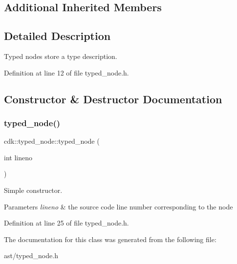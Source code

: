 \subsection*{Additional Inherited Members}


\subsection{Detailed Description}
Typed nodes store a type description. 

Definition at line 12 of file typed\+\_\+node.\+h.



\subsection{Constructor \& Destructor Documentation}
\mbox{\label{classcdk_1_1typed__node_a8dc140896ce9464793806837d6bcd626}} 
\subsubsection{typed\+\_\+node()}
{\footnotesize\ttfamily cdk\+::typed\+\_\+node\+::typed\+\_\+node (\begin{DoxyParamCaption}\item[{int}]{lineno }\end{DoxyParamCaption})\hspace{0.3cm}{\ttfamily [inline]}}

Simple constructor.


\begin{DoxyParams}{Parameters}
{\em lineno} & the source code line number corresponding to the node \\
\hline
\end{DoxyParams}


Definition at line 25 of file typed\+\_\+node.\+h.



The documentation for this class was generated from the following file\+:\begin{DoxyCompactItemize}
\item 
ast/typed\+\_\+node.\+h\end{DoxyCompactItemize}
